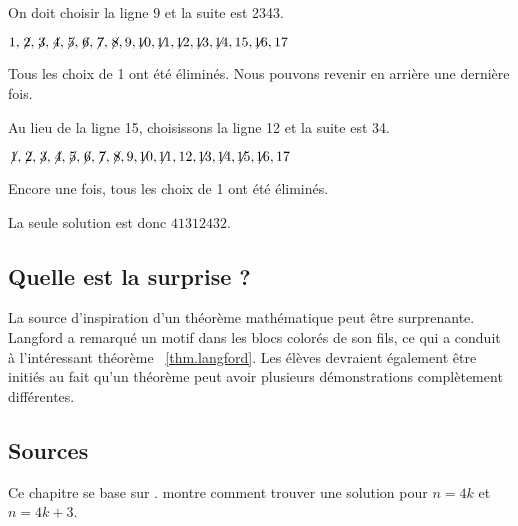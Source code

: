 \noindent On doit choisir la ligne 9 et la suite est 2{}34{}3.

$1,\not\! 2,\not\! 3,\not\! 4,\not\! 5,\not\! 6,\not\! 7,\not\! 8,9,\not\!\! 10,\not\!\! 11,\not\!\! 12,\not\!\! 13,\not\!\! 14,15,\not\!\! 16,17$

\noindent Tous les choix de 1 ont été éliminés. Nous pouvons revenir en arrière une dernière fois. 

\smallskip

\noindent Au lieu de la ligne 15, choisissons la ligne 12 et la suite est 3{}4\textvisiblespace {}.

$\not\! 1,\not\! 2,\not\! 3,\not\! 4,\not\! 5,\not\! 6,\not\! 7,\not\! 8,9,\not\!\! 10,\not\!\! 11,12,\not\!\! 13,\not\!\! 14,\not\!\! 15,\not\!\! 16,17$

\noindent Encore une fois, tous les choix de 1 ont été éliminés.

\medskip

\noindent La seule solution est donc $41312432$.

\subsection*{Quelle est la surprise ?}

La source d'inspiration d'un théorème mathématique peut être surprenante. Langford a remarqué un motif dans les blocs colorés de son fils, ce qui a conduit à l'intéressant théorème~ \ref{thm.langford}. Les élèves devraient également être initiés au fait qu'un théorème peut avoir plusieurs démonstrations complètement différentes.

\subsection*{Sources}
Ce chapitre se base sur \cite{miller}. \cite{davies} montre comment trouver une solution pour $n=4k$ et $n=4k+3$.
